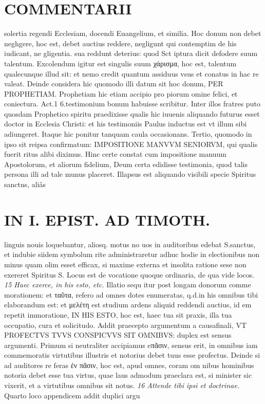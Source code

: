 \documentclass{article}
\begin{document}
\begin{pages}
\section*{COMMENTARII }
\marginpar{[ p.112 ]}\pstart solertia regendi Ecclesiam, docendi Euangelium, et similia. Hoc donum non debet neghgere, hoc est, debet auctius reddere, negligunt qui contemptim de his iudicant, ne gligentia. sua reddunt deterius: quod Sct iptura dicit defodere suum talentum. Excolendum igitur est singulis suum χάρισμα, hoc est, talentum qualecunque illud sit: et nemo credit quantum assiduus vsus et conatus in hac re valeat.  \pend\pstart Deinde considera hic quomodo illi datum sit hoc donum, PER PROPHETIAM. Prophetiam hic etiam accipio pro piorum omine felici, et coniectura. Act.1 6.testimonium bonum habuisse scribitur. Inter illos fratres puto quosdam Prophetico spiritu praedixisse qualis hic iuuenis aliquando futurus esset doctor in Ecclesia Christi: et his testimoniis Paulus inductus est vt illum sibi adiungeret. Itaque hic ponitur tanquam caula occasionans.  \pend\pstart Tertio, quomodo in ipso sit reipsa confirmatum: IMPOSITIONE MANVVM SENIORVM, qui qualis fuerit ritus alibi diximus. Hinc certe constat cum impositione manuum Apostolorum, et aliorum fidelium, Deum certa edidisse testimonia, quod talis persona illi ad tale munus placeret. Illapsus est aliquando visibili specie Spiritus sanctns, aliâs  \pend
\section*{IN I. EPIST. AD TIMOTH. }
\marginpar{[ p.113 ]}\pstart linguis nouis loquebantur, aliosq. motus no uos in auditoribus edebat S.sanctus, et indubie siidem symbolum rite administraretur adhuc hodie in electionibus non minus quam olim esset efficax, si maxime externa et insolita ratione sese non exereret Spiritus S. Locus est de vocatione quoque ordinaria, de qua vide locos.  \pend
\textit{15 Haec exerce, in his esto, etc. }\pstart Illatio sequ itur post longam donorum comme morationem: et ταῦτα, refero ad omnes dotes enumeratas, q.d.in his omnibus tibi elaborandum est: et μελέτη est studium ardens aliquid reddendi auctius, id em repetit immoratione, IN HIS ESTO, hoc est, haec tua sit praxis, illa tua occupatio, cura et solicitudo. Addit praecepto argumentum a causafinali, VT PROFECTVS TVVS CONSPICVVS SIT OMNIBVS: duplex est sensus argumenti. Primum si neutraliter accipiamus eπᾶσιν, sensus erit, in omnibus iam commemoratis virtutibus illustris et notorius debet tuus esse profectus. Deinde si ad auditores re feras ἐν πᾶσιν, hoc est, apud omnes, coram om nibus hominibus notoria debet esse tua virtus, quae laus admodum praeclara est, si minister sic vixerit, et a virtutibus omnibus sit notus.  \pend
\textit{16 Attende tibi ipsi et doctrinae. }\pstart Quarto loco appendicem addit duplici argu\pend

\end{pages}
\end{document}
